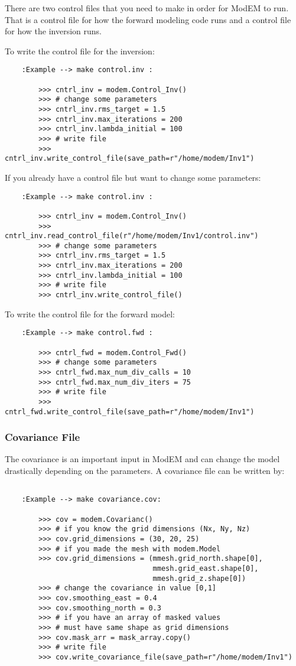 There are two control files that you need to make in order for ModEM to run.  That is a control file for how the forward modeling code runs and a control file for how the inversion runs.

To write the control file for the inversion:

\begin{verbatim}
	:Example --> make control.inv : 
	
		>>> cntrl_inv = modem.Control_Inv()
		>>> # change some parameters
		>>> cntrl_inv.rms_target = 1.5
		>>> cntrl_inv.max_iterations = 200
		>>> cntrl_inv.lambda_initial = 100
		>>> # write file
		>>> cntrl_inv.write_control_file(save_path=r"/home/modem/Inv1")
\end{verbatim}

If you already have a control file but want to change some parameters:

\begin{verbatim}
	:Example --> make control.inv :
	
		>>> cntrl_inv = modem.Control_Inv()
		>>> cntrl_inv.read_control_file(r"/home/modem/Inv1/control.inv")
		>>> # change some parameters
		>>> cntrl_inv.rms_target = 1.5
		>>> cntrl_inv.max_iterations = 200
		>>> cntrl_inv.lambda_initial = 100
		>>> # write file
		>>> cntrl_inv.write_control_file()
\end{verbatim}

To write the control file for the forward model:

\begin{verbatim}
	:Example --> make control.fwd :
	
		>>> cntrl_fwd = modem.Control_Fwd()
		>>> # change some parameters
		>>> cntrl_fwd.max_num_div_calls = 10
		>>> cntrl_fwd.max_num_div_iters = 75
		>>> # write file
		>>> cntrl_fwd.write_control_file(save_path=r"/home/modem/Inv1")
\end{verbatim}

\subsubsection{Covariance File}

The covariance is an important input in ModEM and can change the model drastically depending on the parameters.  A covariance file can be written by:

\begin{verbatim}

	:Example --> make covariance.cov: 
	
		>>> cov = modem.Covarianc()
		>>> # if you know the grid dimensions (Nx, Ny, Nz)
		>>> cov.grid_dimensions = (30, 20, 25)
		>>> # if you made the mesh with modem.Model
		>>> cov.grid_dimensions = (mmesh.grid_north.shape[0], 
								   mmesh.grid_east.shape[0],
								   mmesh.grid_z.shape[0])
		>>> # change the covariance in value [0,1]
		>>> cov.smoothing_east = 0.4
		>>> cov.smoothing_north = 0.3
		>>> # if you have an array of masked values
		>>> # must have same shape as grid dimensions
		>>> cov.mask_arr = mask_array.copy()
		>>> # write file
		>>> cov.write_covariance_file(save_path=r"/home/modem/Inv1")
	
\end{verbatim}




